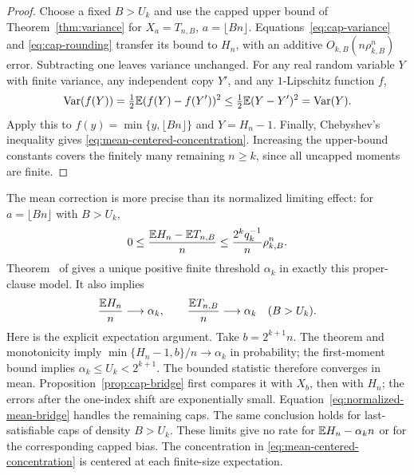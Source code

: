 \begin{proof}
Choose a fixed $B>U_k$ and use
the capped upper bound of Theorem~\ref{thm:variance} for $X_a=T_{n,B}$,
$a=\lfloor Bn\rfloor$. Equations~\eqref{eq:cap-variance} and
\eqref{eq:cap-rounding} transfer its bound to $H_n$, with an additive
$O_{k,B}(n\rho_{k,B}^n)$ error. Subtracting one leaves variance unchanged.
For any real random variable $Y$ with finite variance, any independent
copy $Y'$, and any $1$-Lipschitz function $f$,
\[
 \operatorname{Var}(f(Y))=\tfrac12\mathbb E(f(Y)-f(Y'))^2
 \le\tfrac12\mathbb E(Y-Y')^2=\operatorname{Var}(Y).
\]
Apply this to $f(y)=\min\{y,\lfloor Bn\rfloor\}$ and $Y=H_n-1$.
Finally, Chebyshev's inequality gives
\eqref{eq:mean-centered-concentration}. Increasing the upper-bound
constants covers the finitely many remaining $n\ge k$, since all
uncapped moments are finite.
\end{proof}

The mean correction is more precise than its normalized limiting effect:
for $a=\lfloor Bn\rfloor$ with $B>U_k$,
\begin{equation}\label{eq:normalized-mean-bridge}
 0\le\frac{\mathbb E H_n-\mathbb E T_{n,B}}n
 \le\frac{2^kq_k^{-1}}n\rho_{k,B}^n.
\end{equation}
Theorem~\ThresholdTheorem{} of \cite{FixedKThreshold} gives a unique positive finite
threshold $\alpha_k$ in exactly this proper-clause model.
It also implies
\begin{equation}\label{eq:mean-limit}
 \frac{\mathbb E H_n}{n}\longrightarrow\alpha_k,
 \qquad
 \frac{\mathbb E T_{n,B}}n\longrightarrow\alpha_k
 \quad(B>U_k).
\end{equation}
Here is the explicit expectation argument. Take $b=2^{k+1}n$.
The theorem and monotonicity imply
$\min\{H_n-1,b\}/n\to\alpha_k$ in probability; the first-moment bound
implies $\alpha_k\le U_k<2^{k+1}$.
The bounded statistic therefore converges in mean. Proposition~\ref{prop:cap-bridge}
first compares it with $X_b$, then with $H_n$; the errors after the
one-index shift are exponentially small. Equation~\eqref{eq:normalized-mean-bridge}
handles the remaining caps.
The same conclusion holds for last-satisfiable caps of density
$B>U_k$. These limits give no rate for
$\mathbb E H_n-\alpha_k n$ or for the corresponding capped bias.
The concentration in \eqref{eq:mean-centered-concentration} is centered
at each finite-size expectation.
